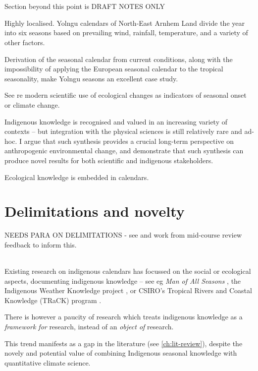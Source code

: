 ~\\
~\\
Section beyond this point is DRAFT NOTES ONLY


Highly localised.
Yolngu calendars of North-East Arnhem Land divide the year into
six seasons based on prevailing wind, rainfall, temperature,
and a variety of other factors.

Derivation of the seasonal calendar from current conditions,
along with the impossibility of applying the European seasonal calendar
to the tropical seasonality, make Yolngu seasons an excellent case study.

See \citet{menzel2006} re modern scientific use of ecological changes
as indicators of seasonal onset or climate change.



Indigenous knowledge is recognised and valued in an increasing variety
of contexts \citep[eg.][]{petheram2010,cochran2015,berkes2012} –
but integration with the physical sciences is still relatively rare and ad-hoc.
%
I argue that such synthesis provides a crucial long-term perspective on
anthropogenic environmental change, and demonstrate that such synthesis
can produce novel results for both scientific and indigenous stakeholders.

Ecological knowledge is embedded in calendars.



\section{Delimitations and novelty}

NEEDS PARA ON DELIMITATIONS - see and work from mid-course review feedback to inform this.

~\\

Existing research on indigenous calendars has focussed on the social or ecological aspects,
documenting indigenous knowledge – see eg \textit{Man of All Seasons} \citep{davis1989},
the Indigenous Weather Knowledge project \citet{BOM-iwk},
or CSIRO’s Tropical Rivers and Coastal Knowledge (TRaCK) program \citep{CSIROcals,oconnor2010}.

There is however a paucity of research which treats indigenous knowledge
as a \emph{framework for} research, instead of an \emph{object of} research.

This trend manifests as a gap in the literature (see \autoref{ch:lit-review}),
despite the novely and potential value of combining Indigenous seasonal knowledge
with quantitative climate science.

